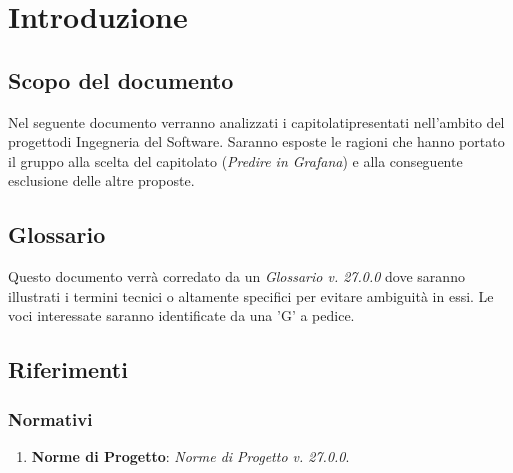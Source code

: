 \section{Introduzione}
\subsection{Scopo del documento}
    Nel seguente documento verranno analizzati i capitolati\glosp presentati nell'ambito del progetto\glosp di Ingegneria del Software. Saranno esposte le ragioni che hanno portato il gruppo alla scelta del capitolato (\textit{Predire in Grafana}\glo) e alla conseguente esclusione delle altre proposte.
\subsection{Glossario}
    Questo documento verrà corredato da un \textit{Glossario v. 27.0.0} dove saranno illustrati i termini tecnici o altamente specifici per evitare ambiguità in essi. Le voci interessate saranno identificate da una 'G' a pedice.
\subsection{Riferimenti}
\subsubsection{Normativi}
\begin{enumerate}
	\item \textbf{Norme di Progetto}: \textit{Norme di Progetto v. 27.0.0}.
\end{enumerate}

